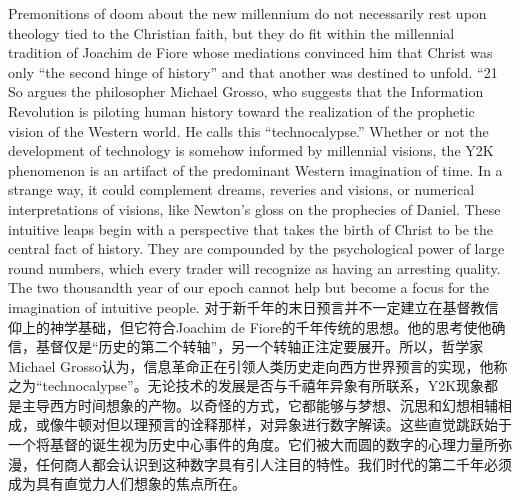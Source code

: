 \begin{Parallel}{97mm}{45mm}
  \ParallelLText
  {Premonitions of doom about the new millennium do not necessarily rest upon theology tied to the Christian faith, but they do fit within the millennial tradition of Joachim de Fiore whose mediations convinced him that Christ was only “the second hinge of history” and that another was destined to unfold. “21 So argues the philosopher Michael Grosso, who suggests that the Information Revolution is piloting human history toward the realization of the prophetic vision of the Western world. He calls this “technocalypse.” Whether or not the development of technology is somehow informed by millennial visions, the Y2K phenomenon is an artifact of the predominant Western imagination of time. In a strange way, it could complement dreams, reveries and visions, or numerical interpretations of visions, like Newton's gloss on the prophecies of Daniel. These intuitive leaps begin with a perspective that takes the birth of Christ to be the central fact of history. They are compounded by the psychological power of large round numbers, which every trader will recognize as having an arresting quality. The two thousandth year of our epoch cannot help but become a focus for the imagination of intuitive people.}  
  \ParallelRText
  {\small 对于新千年的末日预言并不一定建立在基督教信仰上的神学基础，但它符合Joachim de Fiore的千年传统的思想。他的思考使他确信，基督仅是“历史的第二个转轴”，另一个转轴正注定要展开。所以，哲学家Michael Grosso认为，信息革命正在引领人类历史走向西方世界预言的实现，他称之为“technocalypse”。无论技术的发展是否与千禧年异象有所联系，Y2K现象都是主导西方时间想象的产物。以奇怪的方式，它都能够与梦想、沉思和幻想相辅相成，或像牛顿对但以理预言的诠释那样，对异象进行数字解读。这些直觉跳跃始于一个将基督的诞生视为历史中心事件的角度。它们被大而圆的数字的心理力量所弥漫，任何商人都会认识到这种数字具有引人注目的特性。我们时代的第二千年必须成为具有直觉力人们想象的焦点所在。}
  \ParallelPar



\end{Parallel}
